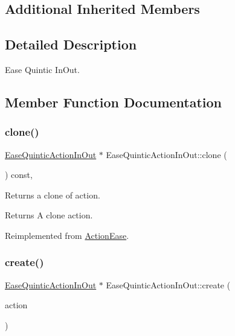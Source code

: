 \subsection*{Additional Inherited Members}


\subsection{Detailed Description}
Ease Quintic In\+Out. 

\subsection{Member Function Documentation}
\mbox{\label{classEaseQuinticActionInOut_a526fb6329aaea716cd6af4ea53d2cc01}} 
\subsubsection{\texorpdfstring{clone()}{clone()}}
{\footnotesize\ttfamily \hyperlink{classEaseQuinticActionInOut}{Ease\+Quintic\+Action\+In\+Out} $\ast$ Ease\+Quintic\+Action\+In\+Out\+::clone (\begin{DoxyParamCaption}\item[{void}]{ }\end{DoxyParamCaption}) const\hspace{0.3cm}{\ttfamily [override]}, {\ttfamily [virtual]}}

Returns a clone of action.

\begin{DoxyReturn}{Returns}
A clone action. 
\end{DoxyReturn}


Reimplemented from \hyperlink{classActionEase_a39bec93fe161fb732a74d8e51a2fe08b}{Action\+Ease}.

\mbox{\label{classEaseQuinticActionInOut_a1d6351b03e4ef3f840f70c94544501ec}} 
\subsubsection{\texorpdfstring{create()}{create()}}
{\footnotesize\ttfamily \hyperlink{classEaseQuinticActionInOut}{Ease\+Quintic\+Action\+In\+Out} $\ast$ Ease\+Quintic\+Action\+In\+Out\+::create (\begin{DoxyParamCaption}\item[{\hyperlink{classActionInterval}{Action\+Interval} $\ast$}]{action }\end{DoxyParamCaption})\hspace{0.3cm}{\ttfamily [static]}}



